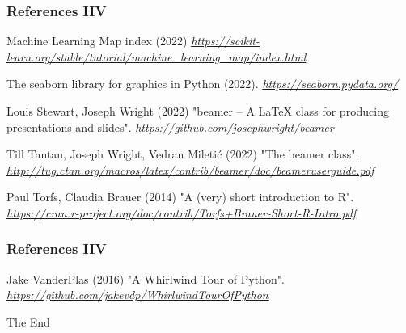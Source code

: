 \documentclass{beamer}
\begin{document}
\begin{frame}
\frametitle{References IIV}
\footnotesize{
\begin{thebibliography}{99} 
 Machine Learning Map index (2022)
\newblock \emph{\url{https://scikit-learn.org/stable/tutorial/machine_learning_map/index.html}}

 The seaborn library for graphics in Python (2022).
\newblock \emph{\url{https://seaborn.pydata.org/}}

 Louis Stewart, Joseph Wright (2022)
\newblock "beamer – A LaTeX class for producing presentations and slides".
\newblock \emph{\url{https://github.com/josephwright/beamer}}

 Till Tantau, Joseph Wright, Vedran Mileti\'{c} (2022)
\newblock "The beamer class".
\newblock \emph{\url{http://tug.ctan.org/macros/latex/contrib/beamer/doc/beameruserguide.pdf}}


 Paul Torfs, Claudia Brauer (2014)
\newblock "A (very) short introduction to R".
\newblock \emph{\url{https://cran.r-project.org/doc/contrib/Torfs+Brauer-Short-R-Intro.pdf}}


\end{thebibliography}
}
\end{frame}





\begin{frame}
\frametitle{References IIV}
\footnotesize{
\begin{thebibliography}{99} 


 Jake VanderPlas (2016)
\newblock "A Whirlwind Tour of Python".
\newblock \emph{\url{https://github.com/jakevdp/WhirlwindTourOfPython}}

\end{thebibliography}
}
\end{frame}





































\begin{frame}
\Huge{\centerline{The End}}
\end{frame}

\end{document}
